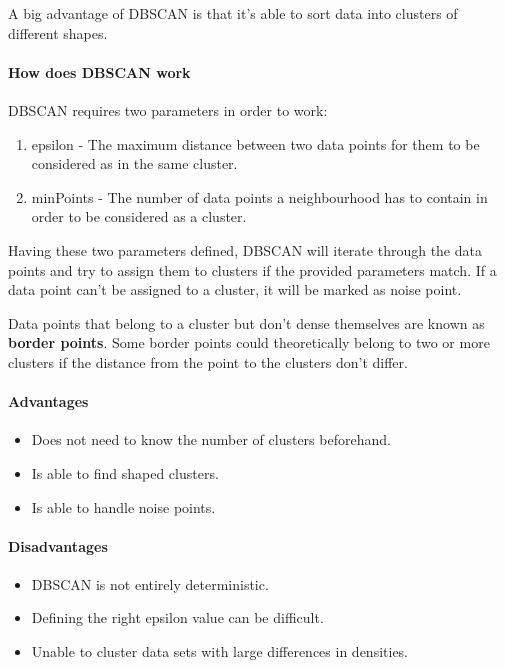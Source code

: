 A big advantage of DBSCAN is that it's able to sort data into clusters
of different shapes.

\paragraph{How does DBSCAN work}
DBSCAN requires two parameters in order to work:

\begin{enumerate}
    \item epsilon - The maximum distance between two data points for them to be considered as in the same cluster.
    \item minPoints - The number of data points a neighbourhood has to contain in order to be considered as a cluster.
\end{enumerate}

Having these two parameters defined, DBSCAN will iterate through the data points
and try to assign them to clusters if the provided parameters match.
If a data point can't be assigned to a cluster, it will be marked as noise point.

Data points that belong to a cluster but don't dense themselves are known as \textbf{border points}.
Some border points could theoretically belong to two or more clusters
if the distance from the point to the clusters don't differ.

\paragraph{Advantages}
\begin{itemize}
    \item Does not need to know the number of clusters beforehand.
    \item Is able to find shaped clusters.
    \item Is able to handle noise points.
\end{itemize}

\paragraph{Disadvantages}
\begin{itemize}
    \item DBSCAN is not entirely deterministic.
    \item Defining the right epsilon value can be difficult.
    \item Unable to cluster data sets with large differences in densities.
\end{itemize}

